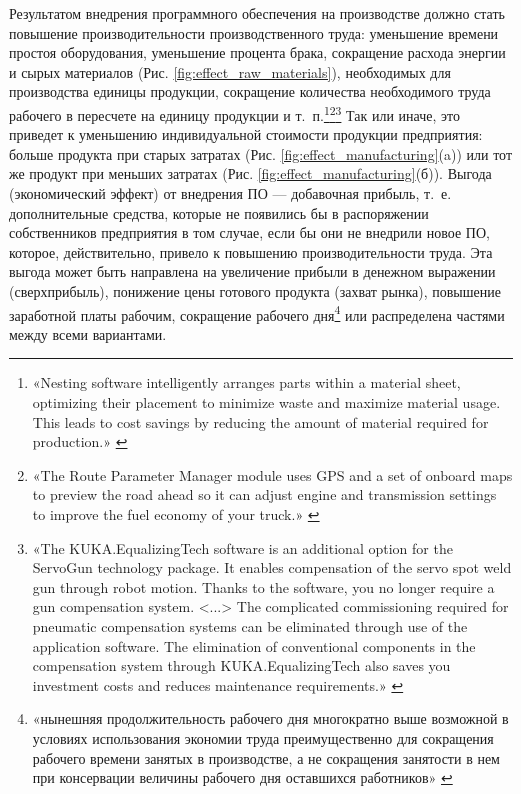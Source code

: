 \documentclass{article}
\begin{document}
Результатом внедрения программного обеспечения на производстве должно стать повышение производительности производственного труда: уменьшение времени простоя оборудования, уменьшение процента брака, сокращение расхода энергии и сырых материалов (Рис. \ref{fig:effect_raw_materials}), необходимых для производства единицы продукции, сокращение количества необходимого труда рабочего в пересчете на единицу продукции и т.~п.\footnote{«Nesting software intelligently arranges parts within a material sheet, optimizing their placement to minimize waste and maximize material usage. This leads to cost savings by reducing the amount of material required for production.» \cite{autodeskNesting}}\footnote{«The Route Parameter Manager module uses GPS and a set of onboard maps to preview the road ahead so it can adjust engine and transmission settings to improve the fuel economy of your truck.» \cite{cumminsAdept}}\footnote{«The KUKA.EqualizingTech software is an additional option for the ServoGun technology package. It enables compensation of the servo spot weld gun through robot motion. Thanks to the software, you no longer require a gun compensation system. <...> The complicated commissioning required for pneumatic compensation systems can be eliminated through use of the application software. The elimination of conventional components in the compensation system through KUKA.EqualizingTech also saves you investment costs and reduces maintenance requirements.» \cite{kukaEqulizingTech}} Так или иначе, это приведет к уменьшению индивидуальной стоимости продукции предприятия: больше продукта при старых затратах (Рис. \ref{fig:effect_manufacturing}(a)) или тот же продукт при меньших затратах (Рис. \ref{fig:effect_manufacturing}(б)). Выгода (экономический эффект) от внедрения ПО — добавочная прибыль, т.~е. дополнительные средства, которые не появились бы в распоряжении собственников предприятия в том случае, если бы они не внедрили новое ПО, которое, действительно, привело к повышению производительности труда. Эта выгода может быть направлена на увеличение прибыли в денежном выражении (сверхприбыль), понижение цены готового продукта (захват рынка), повышение заработной платы рабочим, сокращение рабочего дня\footnote{«нынешняя продолжительность рабочего дня многократно выше возможной в условиях использования экономии труда преимущественно для сокращения рабочего времени занятых в производстве, а не сокращения занятости в нем при консервации величины рабочего дня оставшихся работников» \cite{workingTime2020}} или распределена частями между всеми вариантами.
\end{document}
